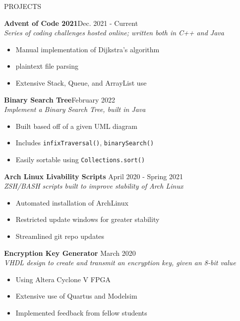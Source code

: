 \documentclass[UTF-8]{resume} \usepackage{multirow}
\begin{document}
\begin{rSection}{PROJECTS}
	\vspace{-1.5em}
	\item \textbf{Advent of Code 2021}\hfill {Dec. 2021 - Current}\\
	\emph{Series of coding challenges hosted online; written both in C++ and Java}
	\begin{itemize}
		\itemsep -6pt {}
		\item Manual implementation of Dijkstra's algorithm
		\item plaintext file parsing
		\item Extensive Stack, Queue, and ArrayList use
	\end{itemize}
	\item \textbf{Binary Search Tree}\hfill {February 2022} \\
	\emph{ Implement a Binary Search Tree, built in Java}
	\begin{itemize}
		\itemsep -6pt {}
		\item Built based off of a given UML diagram
		\item Includes \verb|infixTraversal()|, \verb|binarySearch()|
		\item Easily sortable using \verb|Collections.sort()|
	\end{itemize}
	\item \textbf{Arch Linux Livability Scripts} \hfill {April 2020 - Spring 2021}\\
	\emph{ZSH/BASH scripts built to improve stability of Arch Linux}
	\begin{itemize}
		\itemsep -6pt {}
		\item Automated installation of ArchLinux
		\item Restricted update windows for greater stability
		\item Streamlined git repo updates
	\end{itemize}
	\item \textbf{Encryption Key Generator} \hfill{March 2020}\\
	\emph{VHDL design to create and transmit an encryption key, given an 8-bit value}
	\begin{itemize}
		\itemsep -6pt {}
		\item Using Altera Cyclone V FPGA
		\item Extensive use of Quartus and Modelsim
		\item Implemented feedback from fellow students
	\end{itemize}
\end{rSection}
\end{document}

